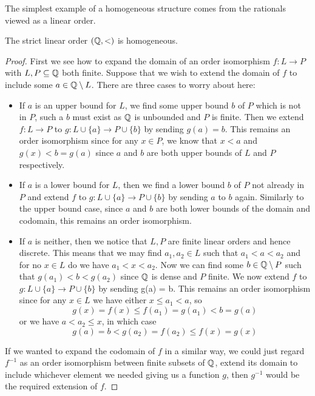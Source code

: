 The simplest example of a homogeneous structure comes from the rationals viewed as a linear
order.

\begin{prop}
  The strict linear order $(\mathbb{Q},<)$ is homogeneous.
\end{prop}
\begin{proof}
  First we see how to expand the
  domain of an order isomorphism $f : L \to P$ with $L, P \subseteq \mathbb{Q}$ both finite. Suppose that we
  wish to extend the domain of $f$ to include some $a \in \mathbb{Q} \setminus L$. There are three cases to
  worry about here:
  \begin{itemize}
    \item If $a$ is an upper bound for $L$, we find some upper bound $b$ of $P$ which is
      not in $P$, such a $b$ must exist as $\mathbb{Q}$ is unbounded and $P$ is finite. Then we extend
      $f : L \to P$ to $g : L \cup \{a\} \to P \cup \{b\}$ by sending $g(a) = b$. This remains an
      order isomorphism since for any $x \in P$, we know that $x < a$ and $g(x) < b = g(a)$ since
      $a$ and $b$ are both upper bounds of $L$ and $P$ respectively.
    \item If $a$ is a lower bound for $L$, then we find a lower bound $b$ of $P$ not already in
      $P$ and extend $f$ to $g : L \cup \{a\} \to P \cup \{b\}$ by sending $a$ to $b$ again.
      Similarly to the upper bound case, since $a$ and $b$ are both lower bounds of the domain and
      codomain, this remains an order isomorphism.
    \item If $a$ is neither, then we notice that $L,P$ are finite linear orders and hence discrete.
      This means that we may find $a_1,a_2 \in L$ such that $a_1 < a < a_2$ and for no $x \in L$ do
      we have $a_1 < x < a_2$. Now we can find some $b \in \mathbb{Q} \setminus P$ such that
      $g(a_1) < b < g(a_2)$ since $\mathbb{Q}$ is dense and $P$ finite. We now extend $f$ to
      $g : L \cup \{a\} \to P \cup \{b\}$ by sending g(a) = b. This remains an order isomorphism
      since for any $x \in L$ we have either $x \leq a_1 < a$, so
      \begin{equation*}
        g(x) = f(x) \leq f(a_1) = g(a_1) < b = g(a)
      \end{equation*}
      or we have $a < a_2 \leq x$, in which case
      \begin{equation*}
        g(a) = b < g(a_2) = f(a_2) \leq f(x) = g(x)
      \end{equation*}
  \end{itemize}
  If we wanted to expand the codomain of $f$ in a similar way, we could just regard $f^{-1}$ as
  an order isomorphism between finite subsets of $\mathbb{Q}$, extend its domain to include whichever
  element we needed giving us a function $g$, then $g^{-1}$ would be the required extension of $f$.


\end{proof}
